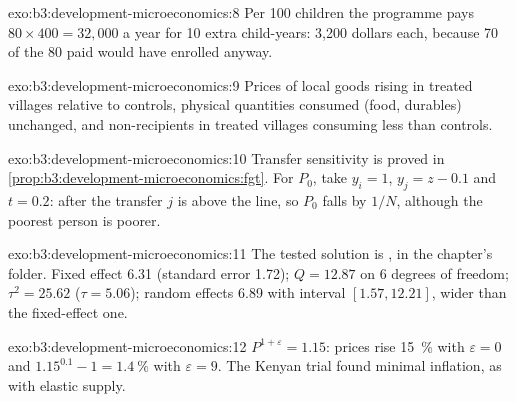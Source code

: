 \begin{solution}{exo:b3:development-microeconomics:8}
Per 100 children the programme pays $80 \times 400 = 32{,}000$ a year for 10 extra child-years: 3{,}200 dollars each, because 70 of the 80
paid would have enrolled anyway.
\end{solution}

\begin{solution}{exo:b3:development-microeconomics:9}
Prices of local goods rising in treated villages relative to controls, physical
quantities consumed (food, durables) unchanged, and non-recipients in treated
villages consuming less than controls.
\end{solution}

\begin{solution}{exo:b3:development-microeconomics:10}
Transfer sensitivity is proved in \cref{prop:b3:development-microeconomics:fgt}. For $P_0$, take $y_i = 1$, $y_j = z - 0.1$ and $t = 0.2$: after the
transfer $j$ is above the line, so $P_0$ falls by $1/N$, although the poorest person is poorer.
\end{solution}

\begin{solution}{exo:b3:development-microeconomics:11}
The tested solution is , in the chapter's
 folder. Fixed effect 6.31 (standard error 1.72); $Q = 12.87$ on 6 degrees of freedom; $\tau^2 = 25.62$ ($\tau = 5.06$);
random effects 6.89 with interval $[1.57, 12.21]$, wider than the fixed-effect one. %
\end{solution}

\begin{solution}{exo:b3:development-microeconomics:12}
$P^{1 + \varepsilon} = 1.15$: prices rise 15~\% with $\varepsilon = 0$ and $1.15^{0.1} - 1 = 1.4~\%$ with $\varepsilon = 9$. The Kenyan trial found minimal inflation, as with elastic supply.
\end{solution}

